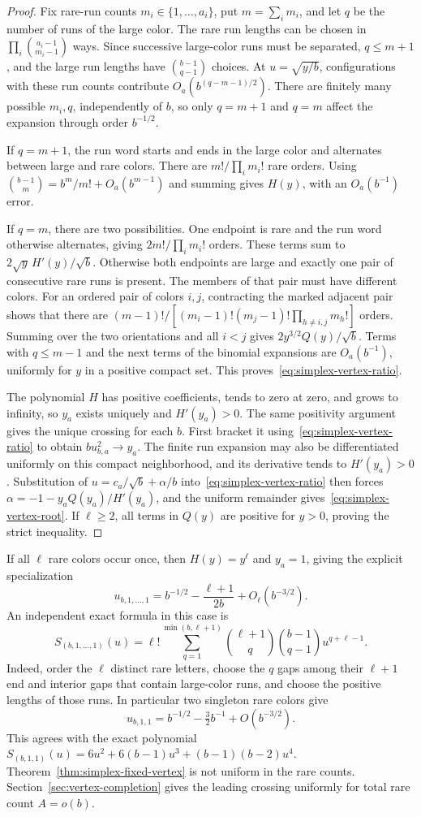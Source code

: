 \begin{proof}
Fix rare-run counts $m_i\in\{1,\ldots,a_i\}$, put $m=\sum_i m_i$,
and let $q$ be the number of runs of the large color. The rare run lengths
can be chosen in $\prod_i\binom{a_i-1}{m_i-1}$ ways. Since successive
large-color runs must be separated, $q\le m+1$, and the large run lengths
have $\binom{b-1}{q-1}$ choices. At $u=\sqrt{y/b}$, configurations with
these run counts contribute $O_a(b^{(q-m-1)/2})$. There are finitely many
possible $m_i,q$, independently of $b$, so only $q=m+1$ and $q=m$ affect
the expansion through order $b^{-1/2}$.

If $q=m+1$, the run word starts and ends in the large color and alternates
between large and rare colors. There are $m!/\prod_i m_i!$ rare orders.
Using $\binom{b-1}{m}=b^m/m!+O_a(b^{m-1})$ and summing gives $H(y)$,
with an $O_a(b^{-1})$ error.

If $q=m$, there are two possibilities. One endpoint is rare and the run
word otherwise alternates, giving $2m!/\prod_i m_i!$ orders. These
terms sum to $2\sqrt y\,H'(y)/\sqrt b$. Otherwise both endpoints are
large and exactly one pair of consecutive rare runs is present. The
members of that pair must have different colors. For an ordered pair
of colors $i,j$, contracting the marked adjacent pair shows that there
are $(m-1)!/[(m_i-1)!(m_j-1)!\prod_{h\ne i,j}m_h!]$ orders.
Summing over the two orientations and all $i<j$ gives
$2y^{3/2}Q(y)/\sqrt b$. Terms with $q\le m-1$ and the next terms of
the binomial expansions are $O_a(b^{-1})$, uniformly for $y$ in a
positive compact set. This proves~\eqref{eq:simplex-vertex-ratio}.

The polynomial $H$ has positive coefficients, tends to zero at zero,
and grows to infinity, so $y_a$ exists uniquely and $H'(y_a)>0$.
The same positivity argument gives the unique crossing for each $b$.
First bracket it using~\eqref{eq:simplex-vertex-ratio} to obtain
$bu_{b,a}^2\to y_a$. The finite run expansion may also be differentiated
uniformly on this compact neighborhood, and its derivative tends to
$H'(y_a)>0$. Substitution of
$u=c_a/\sqrt b+\alpha/b$ into~\eqref{eq:simplex-vertex-ratio}
then forces $\alpha=-1-y_aQ(y_a)/H'(y_a)$, and the uniform remainder
gives~\eqref{eq:simplex-vertex-root}. If $\ell\ge2$, all terms in $Q(y)$
are positive for $y>0$, proving the strict inequality.
\end{proof}

If all $\ell$ rare colors occur once, then $H(y)=y^\ell$ and
$y_a=1$, giving the explicit specialization
\[
u_{b,1,\ldots,1}=b^{-1/2}-\frac{\ell+1}{2b}
+O_\ell(b^{-3/2}).
\]
An independent exact formula in this case is
\[
S_{(b,1,\ldots,1)}(u)=\ell!
\sum_{q=1}^{\min(b,\ell+1)}
\binom{\ell+1}{q}\binom{b-1}{q-1}u^{q+\ell-1}.
\]
Indeed, order the $\ell$ distinct rare letters, choose the $q$ gaps among
their $\ell+1$ end and interior gaps that contain large-color runs,
and choose the positive lengths of those runs.
In particular two singleton rare colors give
\[
u_{b,1,1}=b^{-1/2}-\tfrac32b^{-1}+O(b^{-3/2}).
\]
This agrees with the exact polynomial
$S_{(b,1,1)}(u)=6u^2+6(b-1)u^3+(b-1)(b-2)u^4$.
Theorem~\ref{thm:simplex-fixed-vertex} is not uniform in the rare counts.
Section~\ref{sec:vertex-completion} gives the leading crossing uniformly
for total rare count $A=o(b)$.
